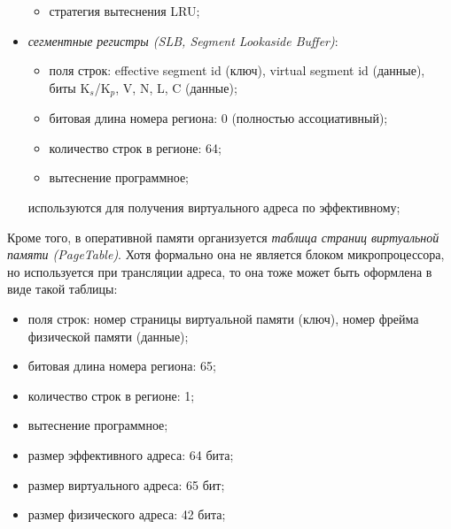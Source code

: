 \documentclass[14pt]{extreport}
\newcommand{\LRU}{\textsf{LRU}\xspace}
\newcommand{\FIFO}{\textsf{FIFO}\xspace}
\begin{document}
\begin{itemize}
\begin{itemize}
            \item стратегия вытеснения \LRU;
        \end{itemize}
  \item \emph{сегментные регистры (SLB, Segment Lookaside Buffer)}:
        \begin{itemize}
            \item поля строк: effective segment id (ключ), virtual segment id
(данные), биты K$_s$/K$_p$, V, N, L, C (данные);
            \item битовая длина номера региона: 0 (полностью ассоциативный);
            \item количество строк в регионе: 64;
            \item вытеснение программное;
        \end{itemize}
        используются для получения виртуального адреса по эффективному;
\end{itemize}

Кроме того, в оперативной памяти организуется \emph{таблица страниц виртуальной
памяти (PageTable)}. Хотя формально она не является блоком микропроцессора, но
используется при трансляции адреса, то она тоже может быть оформлена в виде
такой таблицы:
    \begin{itemize}
        \item поля строк: номер страницы виртуальной памяти (ключ), номер фрейма
физической памяти (данные);
        \item битовая длина номера региона: 65;
        \item количество строк в регионе: 1;
        \item вытеснение программное;
        \item размер эффективного адреса: 64 бита;
        \item размер виртуального адреса: 65 бит;
        \item размер физического адреса: 42 бита;
    \end{itemize}
\end{document}
